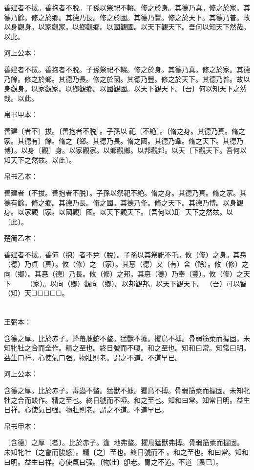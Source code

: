 \documentclass[a5paper]{ctexbook}
\begin{document}
    善建者不拔。善抱者不脱。子孫以祭祀不輟。修之於身。其德乃真。修之於家。其德乃餘。修之於鄉。其德乃長。修之於國。其德乃豐。修之於天下。其德乃普。故以身觀身。以家觀家。以鄉觀鄉。以國觀國。以天下觀天下。吾何以知天下然哉。以此。

    河上公本：

    善建者不拔。善抱者不脱。子孫祭祀不輟。修之於身。其德乃真。修之於家。其德乃餘。修之於鄉。其德乃長。修之於國。其德乃豐。修之於天下。其德乃普。故以身觀身。以家觀家。以鄉觀鄉。以國觀國。以天下觀天下。〔吾〕何以知天下之然哉。以此。

    帛书甲本：

    善建〔者不〕拔。〔善抱者不脱〕。子孫以󱁃祀〔不絶〕。〔脩之身。其德乃真。脩之家。其德有〕餘。脩之〔鄉。其德乃長。脩之國。其德乃夆。脩之天下。其德乃博〕。以身〔觀〕身。以家觀家。以鄉觀鄉。以邦觀邦。以天〔下觀天下。吾何以知天下之然兹。以此〕。

    帛书乙本：

    善建者〔不拔。善抱者不脱〕。子孫以祭祀不絶。脩之身。其德乃真。脩之家。其德有餘。脩之鄉。其德乃長。脩之國。其德乃夆。脩之天下。其德乃博。以身觀身。以家觀〔家。以國觀〕國。以天下觀天下。〔吾何以知〕天下之然兹。以〔此〕。

    楚简乙本：

    善建者不拔。善伂（抱）者不兌（脫）。子孫以其祭祀不乇。攸（修）之身。其惪（德）乃貞（真）。攸（修）之𧱌（家）。其惪（德）又（有）舍（餘）。攸（修）之向（鄉）。其惪（德）乃長。攸（修）之邦。其惪（德）乃奉（豐）。攸（修）之天下☐☐☐☐☐☐☐𧱌（家）。以向（鄉）觀向（鄉）。以邦觀邦。以天下觀天下。󼾲（吾）可以智（知）天☐☐☐☐☐。

    \chapter{}
    王弼本：

    含德之厚。比於赤子。蜂蠆虺蛇不螫。猛獸不據。攫鳥不搏。骨弱筋柔而握固。未知牝牡之合而全作。精之至也。終日號而不嗄。和之至也。知和曰常。知常曰明。益生曰祥。心使氣曰强。物壯則老。謂之不道。不道早已。

    河上公本：

    含德之厚。比於赤子。毒蟲不螫。猛獸不據。玃鳥不搏。骨弱筋柔而握固。未知牝牡之合而䘒作。精之至也。終日號而不啞。和之至也。知和曰常。知常日明。益生日祥。心使氣日强。物壯則老。謂之不道。不道早已。

    帛书甲本：

    〔含德〕之厚〔者〕。比於赤子。逢𢔯𧍥地弗螫。㩴鳥猛獸弗搏。骨弱筋柔而握固。未知牝牡〔之會而朘怒〕。精〔之〕至也。終日號而不𢖻。和之至也。和曰常。知和曰明。益生曰祥。心使氣曰强。〔物壯〕卽老。胃之不道。不道〔蚤已〕。
\end{document}
